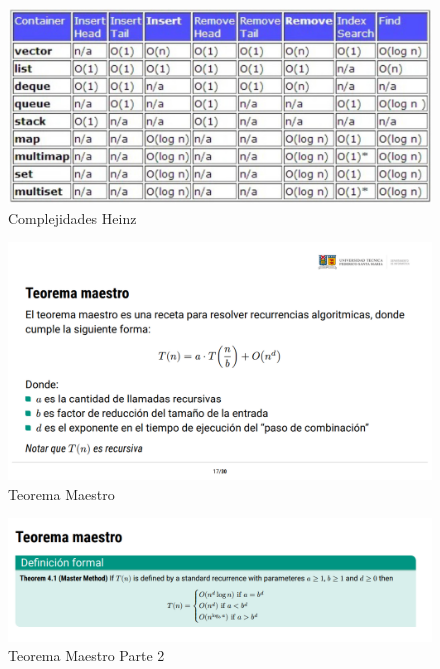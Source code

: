\begin{figure}[h!]
\centering
\includegraphics[width=1\textwidth]{Imagen de WhatsApp 2024-11-22 a las 16.47.40_da962cd3.jpg}
\caption{Complejidades Heinz}
\label{fig:mi_imagen} %
\end{figure}


\begin{figure}[h!]
    \centering
    \includegraphics[width=1\linewidth]{imagen_2024-11-22_170622823.png}
    \caption{Teorema Maestro}
    \label{fig:enter-label}
\end{figure}



\begin{figure}[h!]
    \centering
    \includegraphics[width=0.7\linewidth]{imagen_2024-11-22_170723408.png}
    \caption{Teorema Maestro Parte 2}
    \label{fig:enter-label}
\end{figure}